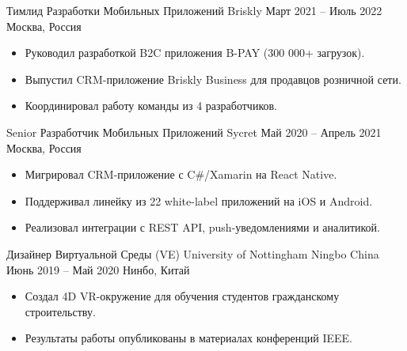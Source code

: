\documentclass[10pt,a4paper,ragged2e]{altacv}
\begin{document}
\cvevent
  {Тимлид Разработки Мобильных Приложений}
  {Briskly}
  {Март 2021 -- Июль 2022}
  {Москва, Россия}
\begin{itemize}
  \item Руководил разработкой B2C приложения B-PAY (300 000+ загрузок).
  \item Выпустил CRM-приложение Briskly Business для продавцов розничной сети.
  \item Координировал работу команды из 4 разработчиков.
\end{itemize}
\divider

\cvevent
  {Senior Разработчик Мобильных Приложений}
  {Sycret}
  {Май 2020 -- Апрель 2021}
  {Москва, Россия}
\begin{itemize}
  \item Мигрировал CRM-приложение с C\#/Xamarin на React Native.
  \item Поддерживал линейку из 22 white-label приложений на iOS и Android.
  \item Реализовал интеграции с REST API, push-уведомлениями и аналитикой.
\end{itemize}
\divider

\cvevent
  {Дизайнер Виртуальной Среды (VE)}
  {University of Nottingham Ningbo China}
  {Июнь 2019 -- Май 2020}
  {Нинбо, Китай}
\begin{itemize}
  \item Создал 4D VR-окружение для обучения студентов гражданскому строительству.
  \item Результаты работы опубликованы в материалах конференций IEEE.
\end{itemize}
\end{document}
